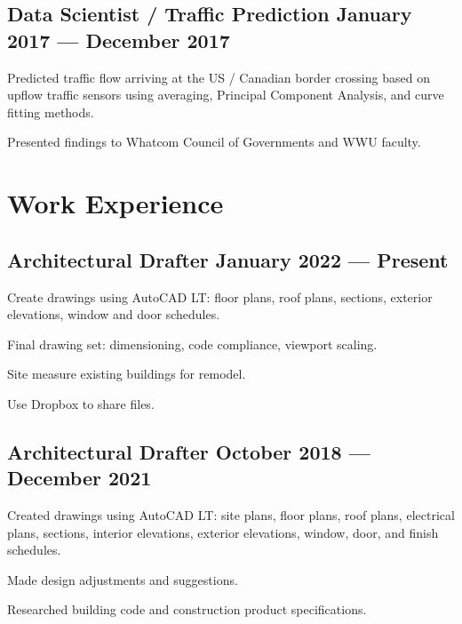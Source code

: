 \documentclass[letter,10pt]{article}
\begin{document}
\subsection{{Data Scientist / Traffic Prediction \hfill January 2017 --- December 2017}}
\begin{zitemize}
    \item Predicted traffic flow arriving at the US / Canadian border crossing based on upflow traffic sensors using averaging, Principal Component Analysis, and curve fitting methods.
    \item Presented findings to Whatcom Council of Governments and WWU faculty.
\end{zitemize}

\section{Work Experience}
\subsection{{Architectural Drafter \hfill January 2022 --- Present}}
\begin{zitemize}
    \item Create drawings using AutoCAD LT: floor plans, roof plans, sections, exterior elevations, window and door schedules.
    \item Final drawing set: dimensioning, code compliance, viewport scaling.
    \item Site measure existing buildings for remodel.
    \item Use Dropbox to share files.
\end{zitemize}

\subsection{{Architectural Drafter \hfill October 2018 --- December 2021}}
\begin{zitemize}
    \item  Created drawings using AutoCAD LT: site plans, floor plans, roof plans, electrical plans, sections, interior elevations, exterior elevations, window, door, and finish schedules.
    \item Made design adjustments and suggestions.
    \item Researched building code and construction product specifications.
\end{zitemize}
\end{document}
